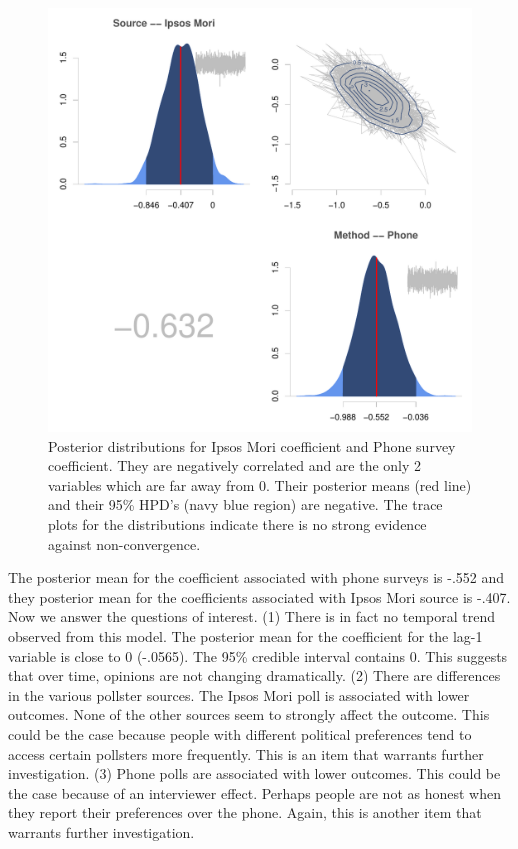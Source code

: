 \documentclass{../../tex_template/asaproc}
\begin{document}
\begin{figure}[H]
  \includegraphics[scale=.5]{figs/posts.pdf}
  \caption{\small Posterior distributions for Ipsos Mori coefficient and Phone survey coefficient.
  They are negatively correlated and are the only 2 variables which are far away from 0. Their
  posterior means (red line) and their 95\% HPD's (navy blue region) are negative. The trace plots 
  for the distributions indicate there is no strong evidence against non-convergence.}
  \label{fig:posts}
\end{figure}
The posterior mean for the coefficient associated with phone surveys is -.552
and they posterior mean for the coefficients associated with Ipsos Mori source
is -.407.\\

Now we answer the questions of interest. (1) There is in fact no temporal trend
observed from this model. The posterior mean for the coefficient for the lag-1
variable is close to 0 (-.0565). The 95\% credible interval contains 0. This 
suggests that over time, opinions are not changing dramatically.
(2) There are differences in the various pollster sources. The Ipsos Mori poll is
associated with lower outcomes. None of the other sources seem to strongly
affect the outcome. This could be the case because people with different political
preferences tend to access certain pollsters more frequently. This is an item
that warrants further investigation. (3) Phone polls are associated with lower outcomes.
This could be the case because of an interviewer effect. Perhaps people are not as
honest when they report their preferences over the phone. Again, this is another
item that warrants further investigation.\\
\end{document}
